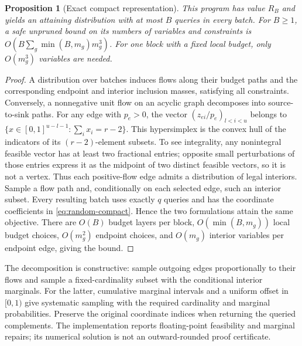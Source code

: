 \documentclass[12pt]{article}
\newtheorem{proposition}{Proposition}
\begin{document}
\begin{proposition}[Exact compact representation]
\label{prop:random-compact}
This program has value $R_B$ and yields an attaining distribution with
at most $B$ queries in every batch. For $B\geq1$, a safe unpruned bound
on its numbers of variables and constraints is
$O(B\sum_g\min(B,m_g)m_g^3)$.
For one block with a fixed local budget, only $O(m_g^3)$ variables are needed.
\end{proposition}
\begin{proof}
A distribution over batches induces flows along their budget paths and
the corresponding endpoint and interior inclusion masses, satisfying
all constraints. Conversely, a nonnegative unit flow on an acyclic graph
decomposes into source-to-sink paths. For any edge with $p_e>0$,
the vector $(z_{ei}/p_e)_{l<i<u}$ belongs to
$\{x\in[0,1]^{u-l-1}:\sum_i x_i=r-2\}$. This hypersimplex is the convex
hull of the indicators of its $(r-2)$-element subsets. To see integrality,
any nonintegral feasible vector has at least two fractional entries;
opposite small perturbations of those entries express it as the midpoint
of two distinct feasible vectors, so it is not a vertex.
Thus each positive-flow edge admits a distribution of legal interiors.
Sample a flow path and, conditionally on each selected edge, such an
interior subset. Every resulting batch uses exactly $q$ queries and
has the coordinate coefficients in \eqref{eq:random-compact}. Hence
the two formulations attain the same objective. There are $O(B)$ budget
layers per block, $O(\min(B,m_g))$ local budget choices, $O(m_g^2)$
endpoint choices, and $O(m_g)$ interior variables per endpoint edge,
giving the bound.
\end{proof}

The decomposition is constructive: sample outgoing edges proportionally
to their flows and sample a fixed-cardinality subset with the conditional
interior marginals. For the latter, cumulative marginal intervals and a
uniform offset in $[0,1)$ give systematic sampling with the required
cardinality and marginal probabilities. Preserve the original coordinate
indices when returning the queried complements. The implementation reports
floating-point feasibility and marginal repairs; its numerical solution
is not an outward-rounded proof certificate.
\end{document}
